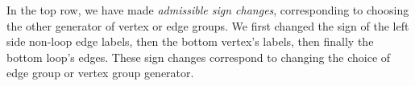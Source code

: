 \documentclass[10pt]{article}
\theoremstyle{definition}
\begin{document}
\begin{itemize}
\begin{center}
\end{center}

In the top row, we have made \textit{admissible sign changes}, corresponding to choosing the other generator of vertex or edge groups. We first changed the sign of the left side non-loop edge labels, then the bottom vertex's labels, then finally the bottom loop's edges. These sign changes correspond to changing the choice of edge group or vertex group generator. 
    
\end{itemize}
\end{document}
